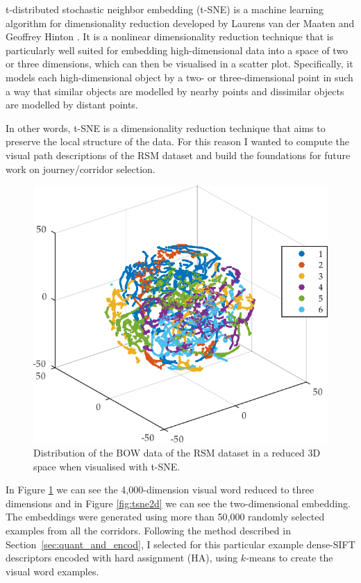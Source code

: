 t-distributed stochastic neighbor embedding (t-SNE) is a machine learning algorithm for dimensionality reduction developed by Laurens van der Maaten and Geoffrey Hinton \cite{maaten2009learning}. It is a nonlinear dimensionality reduction technique that is particularly well suited for embedding high-dimensional data into a space of two or three dimensions, which can then be visualised in a scatter plot. Specifically, it models each high-dimensional object by a two- or three-dimensional point in such a way that similar objects are modelled by nearby points and dissimilar objects are modelled by distant points.

In other words, t-SNE is a dimensionality reduction technique that aims to preserve the local structure of the data. For this reason I wanted to compute the visual path descriptions of the RSM dataset and build the foundations for future work on journey/corridor selection.

\begin{figure}
\centering
\includegraphics[width=\textwidth]{gfx/Chapter04/tsne_dsift_3d.pdf}
\caption{Distribution of the BOW data of the RSM dataset in a reduced 3D space when visualised with t-SNE.}
\label{fig:tsne3d}
\end{figure}

In Figure \ref{fig:tsne3d} we can see the 4,000-dimension visual word reduced to three dimensions and in Figure \ref{fig:tsne2d} we can see the two-dimensional embedding. The embeddings were generated using more than 50,000 randomly selected examples from all the corridors. Following the method described in Section~\ref{sec:quant_and_encod}, I selected for this particular example dense-SIFT descriptors encoded with hard assignment (HA), using $k$-means to create the visual word examples.


